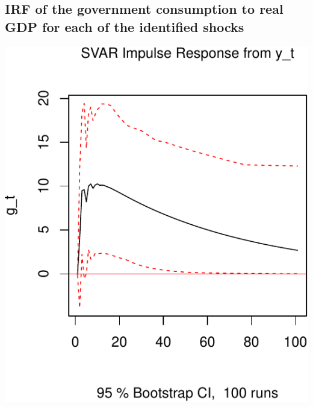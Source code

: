 \documentclass[11pt,preprint, authoryear]{elsarticle}
\numberwithin{equation}{section}
\numberwithin{figure}{section}
\numberwithin{table}{section}
\begin{document}
\hypertarget{irf-of-the-government-consumption-to-real-gdp-for-each-of-the-identified-shocks}{%
\subsection{IRF of the government consumption to real GDP for each of
the identified
shocks}\label{irf-of-the-government-consumption-to-real-gdp-for-each-of-the-identified-shocks}}

\includegraphics{TS_proj_files/figure-latex/unnamed-chunk-20-1.pdf}
\end{document}

